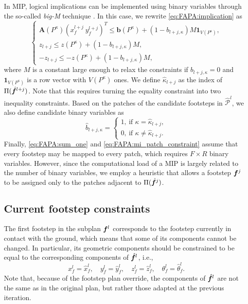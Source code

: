 In MIP, logical implications can be implemented using binary variables through
the so-called {\em big-M} technique
\cite{Afonso2020TaskAllocationTrajectoryPlanning}. In this case, we rewrite
\eqref{eq:FAPA:implication} as
\begin{equation}
	\begin{cases}
		\bm{A}(P^\kappa)\left( x_f^{l+j} \ y_f^{l+j} \right)^T \leq \bm{b}(P^\kappa) + (1 - b_{l+j,\kappa}) M \bm{1}_{V(P^\kappa)}, \\
		z_{l+j} \leq z(P^\kappa) + (1 - b_{l+j,\kappa}) M, \\
		-z_{l+j} \leq -z(P^\kappa) + (1 - b_{l+j,\kappa}) M,
	\end{cases}
\label{eq:FAPA:mi_patch_constraint}
\end{equation}
where $M$ is a constant large enough to relax the constraints if
$b_{l+j,\kappa}=0$ and $\bm{1}_{V(P^\kappa)}$ is a row vector with
$V(P^\kappa)$ ones. We define $\hat \kappa_{l+j}$ as the index of
$\Pi(\hat {{\bm{f}}}^{l+j})$. Note that this requires turning the equality constraint
into two inequality constraints. Based on the patches of the candidate footsteps
in $\mathcal{\hat P}^l$, we also define candidate binary variables as
\begin{equation*}
    \hat b_{l+j,\kappa} =
    \begin{cases}
        1, \ \text{if } \kappa = \hat \kappa_{l+j}, \\
        0, \ \text{if } \kappa \neq \hat \kappa_{l+j}.
    \end{cases}
\end{equation*}
Finally, \eqref{eq:FAPA:sum_one} and \eqref{eq:FAPA:mi_patch_constraint}
assume that every footstep may be mapped to every patch, which requires
$F \times R$ binary variables. However, since the computational load of a
MIP is largely related to the number of binary variables, we employ a heuristic
that allows a footstep ${\bm{f}}^j$ to be assigned only to the patches adjacent to
$\Pi(\hat {{\bm{f}}}^j)$.

\subsection{Current footstep constraints}
The first footstep in the subplan ${\bm{f}}^l$ corresponds to the footstep
currently in contact with the ground, which means that some of its components
cannot be changed. In particular, its geometric components should be
constrained to be equal to the corresponding components of $\hat{{\bm{f}}}^l$, i.e.,
\begin{equation}
    x_f^l = \hat x_f^l, \quad
    y_f^l = \hat y_f^l, \quad
    z_f^l = \hat z_f^l, \quad
    \theta_f^l = \hat \theta_f^l.
    \label{eq:FAPA:current_geometric_constraint}
\end{equation}
Note that, because of the footstep plan override, the components of
$\hat{{\bm{f}}}^l$ are not the same as in the original plan, but rather those
adapted at the previous iteration.

